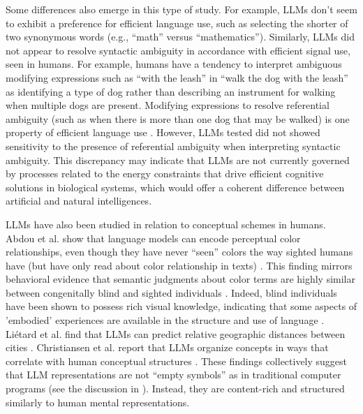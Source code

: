 Some differences also emerge in this type of study.  For example, LLMs don't seem to exhibit a preference for efficient language use, such as selecting the shorter of two synonymous words (e.g., ``math'' versus ``mathematics''). Similarly,  LLMs did not appear to resolve syntactic ambiguity in accordance with efficient signal use, seen in humans. For example, humans have a tendency to interpret ambiguous modifying expressions such as ``with the leash'' in ``walk the dog with the leash'' as identifying a type of dog rather than describing an instrument for walking when multiple dogs are present. Modifying expressions to resolve referential ambiguity (such as when there is more than one dog that may be walked) is one property of efficient language use \cite{frank2012predicting}. However, LLMs tested did not showed sensitivity to the presence of referential ambiguity when interpreting syntactic ambiguity. This discrepancy may indicate that LLMs are not currently governed by processes related to the energy constraints that drive efficient cognitive solutions in biological systems, which would offer a coherent difference between artificial and natural intelligences.

LLMs have also been studied in relation to conceptual schemes in humans. Abdou et al. show that language models can encode perceptual color relationships, even though they have never ``seen'' colors the way sighted humans have (but have only read about color relationship in texts) \cite{abdou2021can}. This finding mirrors behavioral evidence that semantic judgments about color terms are highly similar between congenitally blind and sighted individuals \cite{marmor1978age, saysani2018colour}. Indeed, blind individuals have been shown to possess rich visual knowledge, indicating that some aspects of 'embodied' experiences are available in the structure and use of language \cite{kim2019knowledge, liu2025learning}. Liétard et al. find that LLMs can predict relative geographic distances between cities \cite{lietard2021do}. Christiansen et al. report that LLMs organize concepts in ways that correlate with human conceptual structures \cite{christiansen2023large}. These findings collectively suggest that LLM representations are not ``empty symbols'' as in traditional computer programs (see the discussion in ). Instead, they are content-rich and structured similarly to human mental representations.

